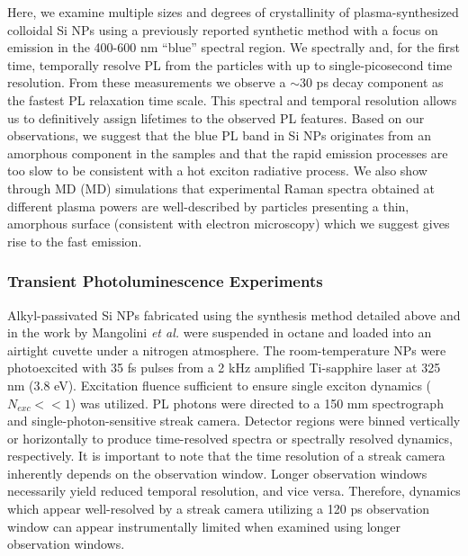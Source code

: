 Here, we examine multiple sizes and degrees of crystallinity of plasma-synthesized colloidal Si NPs using a previously reported synthetic method \cite{PhysRevB.80.115407} with a focus on emission in the 400-600 nm “blue” spectral region. We spectrally and, for the first time, temporally resolve PL from the particles with up to single-picosecond time resolution. From these measurements we observe a $\sim$30 ps decay component as the fastest PL relaxation time scale. This spectral and temporal resolution allows us to definitively assign lifetimes to the observed PL features. Based on our observations, we suggest that the blue PL band in Si NPs originates from an amorphous component in the samples and that the rapid emission processes are too slow to be consistent with a hot exciton radiative process. We also show through MD (MD) simulations that experimental Raman spectra obtained at different plasma powers are well-described by particles presenting a thin, amorphous surface (consistent with electron microscopy) which we suggest gives rise to the fast emission.

\subsubsection{Transient Photoluminescence Experiments}
Alkyl-passivated Si NPs fabricated using the synthesis method detailed above and in the work by Mangolini \emph{et al.} \cite{mangolini2007plasma} were suspended in octane and loaded into an airtight cuvette under a nitrogen atmosphere. The room-temperature NPs were photoexcited with 35 fs pulses from a 2 kHz amplified Ti-sapphire laser at 325 nm (3.8 eV). Excitation fluence sufficient to ensure single exciton dynamics ($N_{exc} << 1$) was utilized. PL photons were directed to a 150 mm spectrograph and single-photon-sensitive streak camera. Detector regions were binned vertically or horizontally to produce time-resolved spectra or spectrally resolved dynamics, respectively. It is important to note that the time resolution of a streak camera inherently depends on the observation window. Longer observation windows necessarily yield reduced temporal resolution, and vice versa. Therefore, dynamics which appear well-resolved by a streak camera utilizing a 120 ps observation window can appear instrumentally limited when examined using longer observation windows.

